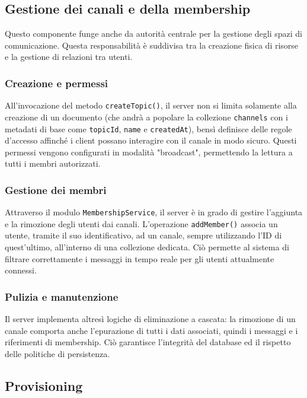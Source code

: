 \documentclass[a4paper, 11pt, twoside]{report}
\begin{document}
\subsection{Gestione dei canali e della membership}

Questo componente funge anche da autorità centrale per la gestione degli spazi di comunicazione. Questa responsabilità
è suddivisa tra la creazione fisica di risorse e la gestione di relazioni tra utenti.

\subsubsection{Creazione e permessi}

All'invocazione del metodo \texttt{createTopic()}, il server non si limita solamente alla creazione di un documento 
(che andrà a popolare la collezione \texttt{channels} con i metadati di base come \texttt{topicId}, \texttt{name} e \texttt{createdAt}),
bensì definisce delle regole d'accesso affinché i client possano interagire con il canale in modo sicuro.
Questi permessi vengono configurati in modalità "broadcast", permettendo la lettura a tutti i membri autorizzati.

\subsubsection{Gestione dei membri}

Attraverso il modulo \texttt{MembershipService}, il server è in grado di gestire l'aggiunta e la rimozione degli utenti dai
canali. L'operazione \texttt{addMember()} associa un utente, tramite il suo identificativo, ad un canale, sempre utilizzando
l'ID di quest'ultimo, all'interno di una collezione dedicata. Ciò permette al sistema di filtrare correttamente i messaggi
in tempo reale per gli utenti attualmente connessi.

\subsubsection{Pulizia e manutenzione}

Il server implementa altresì logiche di eliminazione a cascata: la rimozione di un canale comporta anche l'epurazione di tutti
i dati associati, quindi i messaggi e i riferimenti di membership. Ciò garantisce l'integrità del database ed il rispetto
delle politiche di persistenza.

\subsection{Provisioning}
\end{document}
